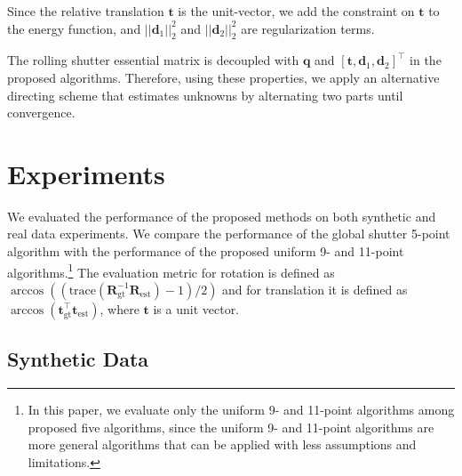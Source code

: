 \documentclass[10pt,twocolumn,letterpaper]{article}
\theoremstyle{definition}
\begin{document}
	Since the relative translation $ \mathbf{t} $ is the unit-vector, we add the constraint on $\mathbf{t}$ to the energy function, and $||\mathbf{d}_1||_2^2$ and $||\mathbf{d}_2||_2^2$ are regularization terms.
	
	The rolling shutter essential matrix is decoupled with $\mathbf{q}$ and $[\mathbf{t}, \mathbf{d}_1, \mathbf{d}_2]^{\top}$ in the proposed algorithms.
	Therefore, using these properties, we apply an alternative directing scheme  that estimates unknowns by alternating two parts until convergence.
	
	\section{Experiments} 
	
	We evaluated the performance of the proposed methods on both synthetic and real data experiments.
	We compare the performance of the global shutter 5-point algorithm \cite{Kneip:ICRA:2014,Nister:PAMI:2004} with the performance of the proposed uniform 9- and 11-point algorithms.\footnote{In this paper, we evaluate only the uniform 9- and 11-point algorithms among proposed five algorithms, since the uniform 9- and 11-point algorithms are more general algorithms that can be applied with less assumptions and limitations.}
	The evaluation metric for rotation is defined as $\arccos((\text{trace}(\mathbf{R}_{\text{gt}}^{-1}\mathbf{R}_{\text{est}})-1)/2) $ and for translation it is defined as $\arccos(\mathbf{t}_{\text{gt}}^{\top} \mathbf{t}_{\text{est}}) $,
	where $\mathbf{t}$ is a unit vector.
	
	\subsection{Synthetic Data}
	
	
	
\end{document}
